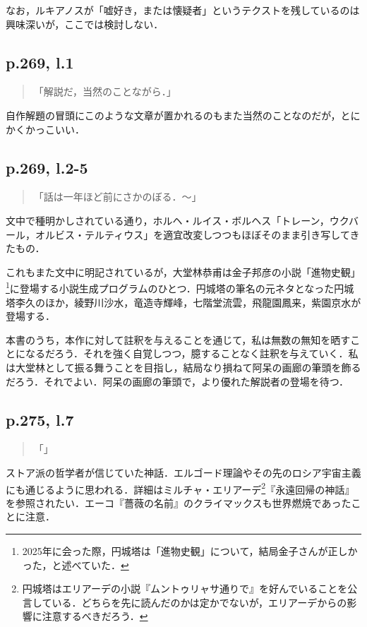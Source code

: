 \documentclass[10pt, a5paper, twoside]{ltjsarticle}
\begin{document}
            なお，ルキアノスが「嘘好き，または懐疑者」というテクストを残しているのは興味深いが，ここでは検討しない．

        \subsection{p.269, l.1}

            \begin{quote}
                「解説だ，当然のことながら．」
            \end{quote}

            自作解題の冒頭にこのような文章が置かれるのもまた当然のことなのだが，とにかくかっこいい．

        \subsection{p.269, l.2-5}

            \begin{quote}
                「話は一年ほど前にさかのぼる．〜」
            \end{quote}

            文中で種明かしされている通り，ホルヘ・ルイス・ボルヘス「トレーン，ウクバール，オルビス・テルティウス」を適宜改変しつつもほぼそのまま引き写してきたもの．

            これもまた文中に明記されているが，大堂林恭甫は金子邦彦の小説「進物史観」\footnote{2025年に会った際，円城塔は「進物史観」について，結局金子さんが正しかった，と述べていた．}に登場する小説生成プログラムのひとつ．円城塔の筆名の元ネタとなった円城塔李久のほか，綾野川沙水，竜造寺輝峰，七階堂流雲，飛龍園鳳来，紫園京水が登場する．

            本書のうち，本作に対して註釈を与えることを通じて，私は無数の無知を晒すことになるだろう．それを強く自覚しつつ，臆することなく註釈を与えていく．私は大堂林として振る舞うことを目指し，結局なり損ねて阿呆の画廊の筆頭を飾るだろう．それでよい．阿呆の画廊の筆頭で，より優れた解説者の登場を待つ．

        \subsection{p.275, l.7}

            \begin{quote}
                「」
            \end{quote}

            ストア派の哲学者が信じていた神話．エルゴード理論やその先のロシア宇宙主義にも通じるように思われる．詳細はミルチャ・エリアーデ\footnote{円城塔はエリアーデの小説『ムントゥリャサ通りで』を好んでいることを公言している\cite{sfm}．どちらを先に読んだのかは定かでないが，エリアーデからの影響に注意するべきだろう．}『永遠回帰の神話』\cite{eliade}を参照されたい．エーコ『薔薇の名前』のクライマックスも世界燃焼であったことに注意．
\end{document}
